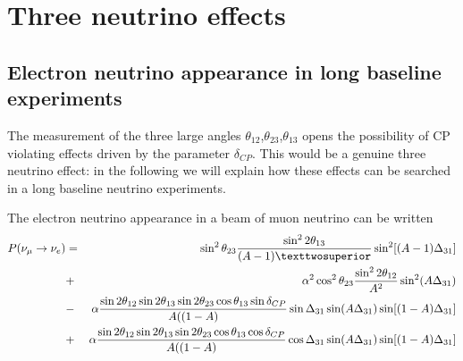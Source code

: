 \section{Three neutrino effects}
\subsection{Electron neutrino appearance in long baseline experiments}
\label{sec:questdelta}

The measurement of the three large angles $\theta_{12}$,$\theta_{23}$,$\theta_{13}$ opens the possibility of CP violating effects driven by the parameter $\delta_{CP}$. This would be a genuine three neutrino effect: in the following we will explain how these effects can be searched in a long baseline neutrino experiments.

The electron neutrino appearance in a beam of muon neutrino can be written
\begin{eqnarray*}
\papp & = & \sin^2 \theta_{23} \frac{\sin^2 2 \theta_{13}}{(A-1)²} \sin^2 [(A-1) \Delta_{31}] \\
&+& \alpha^2 \cos^2 \theta_{23} \frac{\sin^2 2 \theta_{12}}{A^2} \sin^2 (A\Delta_{31}) \\
&-& \alpha \frac{\sin 2 \theta_{12}\sin 2 \theta_{13}\sin 2 \theta_{23}\cos  \theta_{13}\sin  \delta_{CP}}{A ((1-A)} \sin \Delta_{31} \sin (A\Delta_{31})\sin[ (1-A) \Delta_{31}] \\
&+& \alpha \frac{\sin 2 \theta_{12}\sin 2 \theta_{13}\sin 2 \theta_{23}\cos  \theta_{13}\cos  \delta_{CP}}{A ((1-A)} \cos \Delta_{31} \sin (A\Delta_{31})\sin[ (1-A) \Delta_{31}] \\
\end{eqnarray*}
\begin{equation}
\label{eq:theta13app}
\end{equation}

